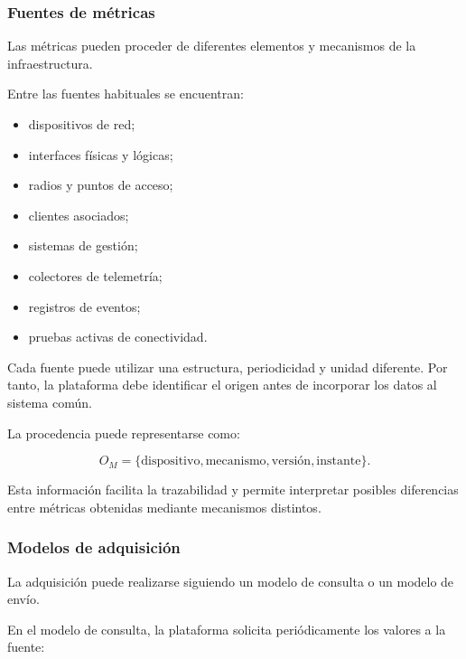\subsubsection*{Fuentes de métricas}

Las métricas pueden proceder de diferentes elementos y mecanismos de la
infraestructura.

Entre las fuentes habituales se encuentran:

\begin{itemize}
    \item dispositivos de red;

    \item interfaces físicas y lógicas;

    \item radios y puntos de acceso;

    \item clientes asociados;

    \item sistemas de gestión;

    \item colectores de telemetría;

    \item registros de eventos;

    \item pruebas activas de conectividad.
\end{itemize}

Cada fuente puede utilizar una estructura, periodicidad y unidad
diferente. Por tanto, la plataforma debe identificar el origen antes de
incorporar los datos al sistema común.

La procedencia puede representarse como:

\[
    O_M
    =
    \{
        \text{dispositivo},
        \text{mecanismo},
        \text{versión},
        \text{instante}
    \}.
\]

Esta información facilita la trazabilidad y permite interpretar posibles
diferencias entre métricas obtenidas mediante mecanismos distintos.


\subsubsection*{Modelos de adquisición}

La adquisición puede realizarse siguiendo un modelo de consulta o un
modelo de envío.

En el modelo de consulta, la plataforma solicita periódicamente los
valores a la fuente:

